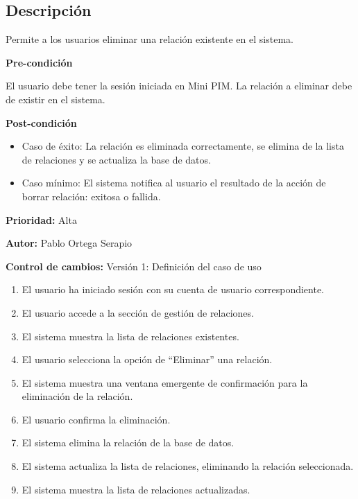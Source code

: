 
\subsection*{Descripción}
Permite a los usuarios eliminar una relación existente en el sistema.\par
\vspace{0.15cm}

\textbf{Pre-condición}\par
El usuario debe tener la sesión iniciada en Mini PIM. La relación a eliminar debe de existir en el sistema.\par
\vspace{0.15cm}

\textbf{Post-condición}
\begin{itemize}
    \item Caso de éxito: La relación es eliminada correctamente, se elimina de la lista de relaciones y se actualiza la base de datos.
    \item Caso mínimo: El sistema notifica al usuario el resultado de la acción de borrar relación: exitosa o fallida.
\end{itemize}

\textbf{Prioridad: }
Alta
\vspace{0.15cm}

\textbf{Autor: }
Pablo Ortega Serapio\par
\vspace{0.15cm}

\textbf{Control de cambios: } Versión 1: Definición del caso de uso

\begin{enumerate}
    \item El usuario ha iniciado sesión con su cuenta de usuario correspondiente.
    \item El usuario accede a la sección de gestión de relaciones.
    \item El sistema muestra la lista de relaciones existentes.
    \item El usuario selecciona la opción de \enquote{Eliminar} una relación.
    \item El sistema muestra una ventana emergente de confirmación para la eliminación de la relación.
    \item El usuario confirma la eliminación.
    \item El sistema elimina la relación de la base de datos.
    \item El sistema actualiza la lista de relaciones, eliminando la relación seleccionada.
    \item El sistema muestra la lista de relaciones actualizadas.
\end{enumerate}

